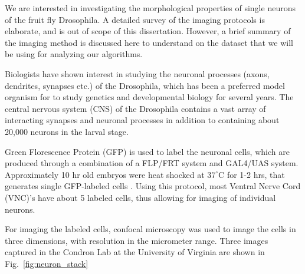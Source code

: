 We are interested in investigating the morphological properties of single neurons of the fruit fly Drosophila. A detailed survey of the imaging protocols is elaborate, and is out of scope of this dissertation. However, a brief summary of the imaging method is discussed here to understand on the dataset that we will be using for analyzing our algorithms.

Biologists have shown interest in studying the neuronal processes (axons, dendrites, synapses etc.) of the Drosophila, which has been a preferred model organism for to study genetics and developmental biology for several years.  The central nervous system (CNS) of the Drosophila contains a vast array of interacting synapses and neuronal processes in addition to containing about 20,000 neurons in the larval stage.  

Green Florescence Protein (GFP) is used to label the neuronal cells, which are produced through a combination of a FLP/FRT system and GAL4/UAS system. Approximately 10 hr old embryos were heat shocked at $37^\circ$C for 1-2 hrs, that generates single GFP-labeled cells \cite{barry_serotonergic}. Using this protocol, most Ventral Nerve Cord (VNC)'s have about 5 labeled cells, thus allowing for imaging of individual neurons.

For imaging the labeled cells, confocal microscopy was used to image the cells in three dimensions, with resolution in the micrometer range. Three images captured in the Condron Lab at the University of Virginia are shown in Fig.~\ref{fig:neuron_stack}





